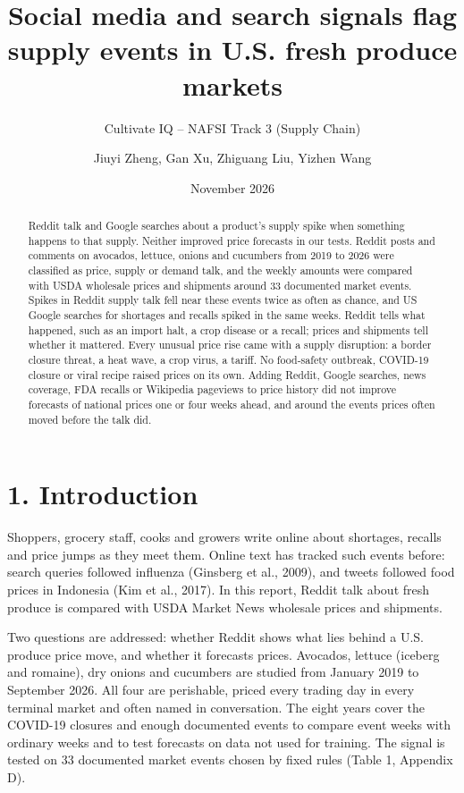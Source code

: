 \documentclass[
  11pt,
]{article}
\title{Social media and search signals flag supply events in U.S. fresh produce markets}
\subtitle{Cultivate IQ -- NAFSI Track 3 (Supply Chain)}
\author{Jiuyi Zheng, Gan Xu, Zhiguang Liu, Yizhen Wang}
\date{November 2026}
\begin{document}
\maketitle
\begin{abstract}
Reddit talk and Google searches about a product's supply spike when
something happens to that supply. Neither improved price forecasts in our tests. Reddit posts
and comments on
avocados, lettuce, onions and cucumbers from 2019 to 2026 were classified
as price, supply or demand talk, and the weekly amounts were compared
with USDA wholesale prices and shipments around 33 documented market
events.
Spikes in Reddit supply talk fell near these events twice as often as
chance, and US Google searches for shortages and recalls spiked in the
same weeks. Reddit tells what happened, such as an import halt, a crop disease
or a recall; prices and shipments tell whether it mattered. Every unusual
price rise came with a supply disruption: a border closure threat, a heat
wave, a crop virus, a tariff. No food-safety outbreak, COVID-19 closure
or viral recipe raised prices on its own. Adding Reddit, Google
searches, news coverage, FDA recalls or Wikipedia pageviews to price
history did not improve forecasts of national prices one or four weeks
ahead, and around the events prices often moved before the talk did.
\end{abstract}

\section{1. Introduction}\label{introduction}

Shoppers, grocery staff, cooks and growers write online about
shortages, recalls and price jumps as they meet them. Online text has
tracked such events before: search queries followed influenza (Ginsberg
et al., 2009), and tweets followed food prices in Indonesia (Kim et al.,
2017). In this report, Reddit talk about fresh produce is compared with
USDA Market News wholesale prices and shipments.

Two questions are addressed: whether Reddit shows what lies behind a
U.S. produce price move, and whether it forecasts prices. Avocados,
lettuce (iceberg and romaine), dry onions and cucumbers are studied from
January 2019 to September 2026. All four are perishable, priced every
trading day in every terminal market and often named in conversation.
The eight years cover the COVID-19 closures and enough documented events
to compare event weeks with ordinary weeks and to test forecasts on data
not used for training.
The signal is tested on 33 documented market events chosen by fixed
rules (Table 1, Appendix D).
\end{document}
